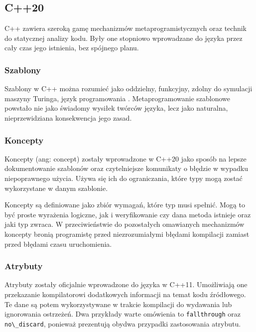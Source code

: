 \subsection{C++20}
C++ \cite{ISO:cpp20} zawiera szeroką gamę mechanizmów metaprogramistycznych oraz technik do statycznej analizy kodu. Były one stopniowo wprowadzane do języka przez cały czas jego istnienia, bez spójnego planu.\par
\subsubsection{Szablony}
Szablony w C++ można rozumieć jako oddzielny, funkcyjny, zdolny do symulacji maszyny Turinga, język programowania \cite{template_turing_complete}.
Metaprogramowanie szablonowe powstało nie jako świadomy wysiłek twórców języka, lecz jako naturalna, nieprzewidziana konsekwencja jego zasad.

\subsubsection{Koncepty}
Koncepty (ang: concept) zostały wprowadzone w C++20 \cite{ISO:cpp20} jako sposób na lepsze dokumentowanie szablonów oraz czytelniejsze komunikaty o błędzie w wypadku niepoprawnego użycia.
Używa się ich do ograniczania, które typy mogą zostać wykorzystane w danym szablonie.

Koncepty są definiowane jako zbiór wymagań, które typ musi spełnić.
Mogą to być proste wyrażenia logiczne, jak i weryfikowanie czy dana metoda istnieje oraz jaki typ zwraca.
W przeciwieństwie do pozostałych omawianych mechanizmów koncepty bronią programistę przed niezrozumiałymi błędami kompilacji zamiast przed błędami czasu uruchomienia.

\subsubsection{Atrybuty}
Atrybuty zostały oficjalnie wprowadzone do języka w C++11\cite{ISO:2012:III}. 
Umożliwiają one przekazanie kompilatorowi dodatkowych informacji na temat kodu źródłowego.
Te dane są potem wykorzystywane w trakcie kompilacji do wydawania lub ignorowania ostrzeżeń.
Dwa przykłady warte omówienia to \lstinline{fallthrough} oraz \lstinline{no\_discard}, ponieważ prezentują obydwa przypadki zastosowania atrybutu.

